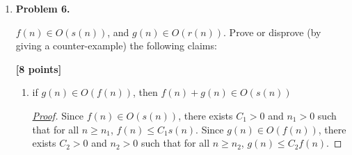 \documentclass[11pt]{article}
\newcommand{\floor}[1]{\left\lfloor #1 \right\rfloor}
\begin{document}
\begin{enumerate}
\begin{proof}[\underline{Proof}]
\begin{enumerate}
    \item \(f_a(n) = n! \Rightarrow f_h(n) = \Theta(n!)\)
    \item \(f_b(n) = \sqrt{\log{n^{20}}} = \sqrt{20 \cdot log{n}} = \sqrt{20} \cdot \sqrt{log{n}} \Rightarrow \Theta(\sqrt{log{n}})\)
    \item \(f_c(n) = 2^{n^{3}} \Rightarrow \Theta(2^{n^{3}})\)
    \item \(f_d(n) = n \cdot \frac{\ln n}{\ln 2} = n \cdot log_{2}{n} \Rightarrow \Theta(n log{n})\)
    \item \(f_e(n) = n(log{n})^{20} \Rightarrow \Theta(n(log{n})^{20})\)
    \item \(f_f(n) = n^{log{n}} \Rightarrow \Theta(n^{log{n}})\)
    \item \(f_g(n) = log{\sqrt{n^{20}}} = log{n^{\frac{20}{2}}} = 10 log n \Rightarrow \Theta(log n)\)
    \item \(f_h(n) = \floor{\pi e}!  \approx \floor{3.14 * 2.71}! = 8!\), which is a constant function. \(\Rightarrow f_h(n) = \Theta(1)\)
    \item \(f_i(n) = \Pi^{n}_{i=1} \frac{i+1}{i} = \frac{1+1}{1} \cdot \frac{2+1}{2} \cdot \frac{3+1}{3} \cdots \frac{n+1}{n} = n + 1\) by telescoping. \(\Rightarrow f_i(n) = \Theta(n)\)
    \item \(f_j(n) = \frac{n}{f_h(n)}\) by \((h.)\) \(f_j(n) = \frac{n}{8!} \Rightarrow \Theta(n)\)
\end{enumerate}

\[
h < b < g < j, i < d < e < f < a < c
\]    
\end{proof}

\newpage

\item \textbf{Problem 6.}

\(f(n) \in O(s(n))\), and \(g(n) \in O(r(n))\). Prove or disprove (by giving a counter-example) the following claims:

\begin{flushright}
\textbf{[8 points]}
\end{flushright}

\begin{enumerate}
\item if \(g(n) \in O(f(n))\), then \(f(n) + g(n) \in O(s(n))\)

\begin{proof}[\underline{Proof}]

Since \(f(n) \in O(s(n))\), there exists \(C_1 > 0\) and \(n_1 > 0\) such that for all \(n \ge n_1\), \(f(n) \le C_1 s(n)\).
Since \(g(n) \in O(f(n))\), there exists \(C_2 > 0\) and \(n_2 > 0\) such that for all \(n \ge n_2\), \(g(n) \le C_2 f(n)\).


\end{proof}
\end{enumerate}
\end{enumerate}
\end{document}
